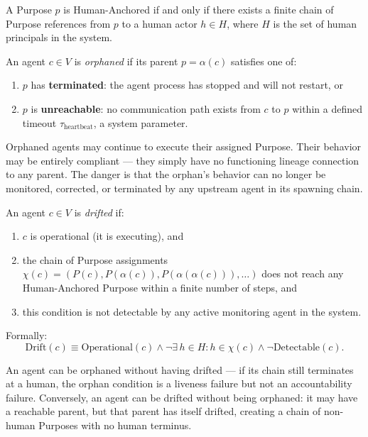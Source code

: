 \begin{dfn}
\label{dfn:human-anchored-purpose}
A Purpose $p$ is Human-Anchored if and only if there exists a finite chain of Purpose references from $p$ to a human actor $h \in H$, where $H$ is the set of human principals in the system.
\end{dfn}

\begin{dfn}
\label{dfn:orphaned-agent}
An agent $c \in V$ is \textit{orphaned} if its parent $p = \alpha(c)$ satisfies one of:
\begin{enumerate}
    \item $p$ has \textbf{terminated}: the agent process has stopped and will not restart, or
    \item $p$ is \textbf{unreachable}: no communication path exists from $c$ to $p$ within a defined timeout $\tau_{\text{heartbeat}}$, a system parameter.
\end{enumerate}
\end{dfn}

Orphaned agents may continue to execute their assigned Purpose. Their behavior may be entirely compliant — they simply have no functioning lineage connection to any parent. The danger is that the orphan's behavior can no longer be monitored, corrected, or terminated by any upstream agent in its spawning chain.

\begin{dfn}
\label{dfn:drifted-agent}
An agent $c \in V$ is \textit{drifted} if:
\begin{enumerate}
    \item $c$ is operational (it is executing), and
    \item the chain of Purpose assignments $\chi(c) = (P(c), P(\alpha(c)), P(\alpha(\alpha(c))),\ldots)$ does not reach any Human-Anchored Purpose within a finite number of steps, and
    \item this condition is not detectable by any active monitoring agent in the system.
\end{enumerate}
Formally:
\[
\text{Drift}(c) \equiv \text{Operational}(c) \land \neg \exists\, h \in H : h \in \chi(c) \land \neg \text{Detectable}(c).
\]
\end{dfn}

An agent can be orphaned without having drifted — if its chain still terminates at a human, the orphan condition is a liveness failure but not an accountability failure. Conversely, an agent can be drifted without being orphaned: it may have a reachable parent, but that parent has itself drifted, creating a chain of non-human Purposes with no human terminus.

